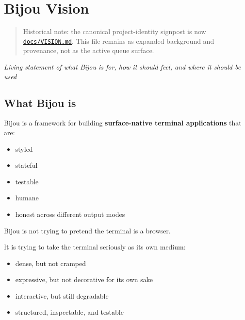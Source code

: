 \chapter{Bijou Vision}\label{record-035}

\smallskip

\begin{quote}
Historical note: the canonical project-identity signpost is now \href{https://github.com/flyingrobots/bijou/blob/cbd70612140e7a450d764b3c7be1c6af878b99bc/docs/VISION.md}{\texttt{d\allowbreak{}o\allowbreak{}c\allowbreak{}s\allowbreak{}/\allowbreak{}V\allowbreak{}I\allowbreak{}S\allowbreak{}I\allowbreak{}O\allowbreak{}N\allowbreak{}.\allowbreak{}m\allowbreak{}d}}. This file remains as expanded background and provenance, not as the active queue surface.
\end{quote}

\emph{Living statement of what Bijou is for, how it should feel, and where it should be used}

\section{What Bijou is}\label{record-035-what-bijou-is}

Bijou is a framework for building \textbf{surface-native terminal applications} that are:

\begin{itemize}
\tightlist
\item
  styled
\item
  stateful
\item
  testable
\item
  humane
\item
  honest across different output modes
\end{itemize}

Bijou is not trying to pretend the terminal is a browser.

It is trying to take the terminal seriously as its own medium:

\begin{itemize}
\tightlist
\item
  dense, but not cramped
\item
  expressive, but not decorative for its own sake
\item
  interactive, but still degradable
\item
  structured, inspectable, and testable
\end{itemize}

